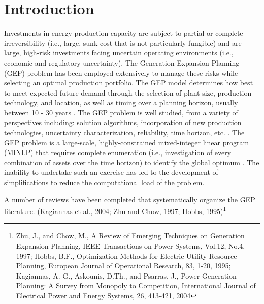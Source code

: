 \documentclass[10pt]{amsart}
\begin{document}
\section{Introduction}
Investments in energy production capacity are subject to partial or complete irreversibility (i.e., large, sunk cost that is not particularly fungible) and are large, high-risk investments facing uncertain operating environments (i.e., economic and regulatory uncertainty)\parencite{bakirtzis:2012aa}. 
The Generation Expansion Planning (GEP) problem has been employed extensively to manage these risks while selecting an optimal production portfolio. 
The GEP model determines how best to meet expected future demand through the selection of plant size, production technology, and location, as well as timing over a planning horizon, usually between 10 - 30 years \parencite{hemmati:2013ab}. 
The GEP problem is well studied, from a variety of perspectives including: solution algorithms, incorporation of new production technologies, uncertainty characterization, reliability, time horizon, etc. \parencite{hemmati:2013ab}.
The GEP problem is a large-scale, highly-constrained mixed-integer linear program (MINLP) that requires complete enumeration (i.e., investigation of every combination of assets over the time horizon) to identify the global optimum \parencite{bakirtzis:2012aa}.  
The inability to undertake such an exercise has led to the development of simplifications to reduce the computational load of the problem. 

A number of reviews have been completed that systematically organize the GEP literature.
\parencite{bakirtzis:2012aa, hemmati:2013ab}(Kagiannas et al., 2004; Zhu and Chow, 1997; Hobbs, 1995)\footnote{ Zhu, J., and Chow, M., A Review of Emerging Techniques on Generation Expansion
Planning, IEEE Transactions on Power Systems, Vol.12, No.4, 1997; Hobbs, B.F., Optimization Methods for Electric Utility Resource Planning, European
Journal of Operational Research, 83, 1-20, 1995; 
Kagiannas, A. G., Askounis, D.Th., and Psarras, J., Power Generation Planning: A Survey
from Monopoly to Competition, International Journal of Electrical Power and Energy
Systems, 26, 413-421, 2004}
\end{document}
